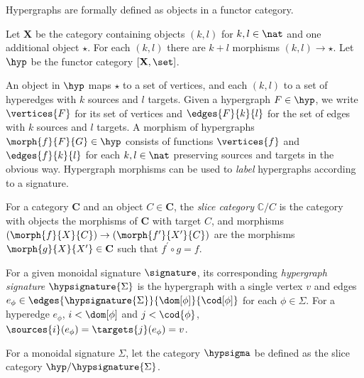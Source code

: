 Hypergraphs are formally defined as objects in a functor category.

\begin{definition}[Hypergraph]
    Let \(\mathbf{X}\) be the category containing objects \((k, l)\) for
    \(k, l \in \nat\) and one additional object \(\star\).
    For each \((k, l)\) there are \(k + l\) morphisms \((k, l) \to \star\).
    Let \(\hyp\) be the functor category \([\mathbf{X},\set]\).
\end{definition}

An object in \(\hyp\) maps \(\star\) to a set of vertices, and each \((k,l)\) to
a set of hyperedges with \(k\) sources and \(l\) targets.
Given a hypergraph \(F \in \hyp\), we write \(\vertices{F}\) for its set of
vertices and \(\edges{F}{k}{l}\) for the set of edges with \(k\) sources and
\(l\) targets.
A morphism of hypergraphs \(\morph{f}{F}{G} \in \hyp\) consists of functions
\(\vertices{f}\) and \(\edges{f}{k}{l}\) for each \(k,l \in \nat\) preserving
sources and targets in the obvious way.
Hypergraph morphisms can be used to \emph{label} hypergraphs according to a
signature.

\begin{definition}
    For a category \(\mathbf{C}\) and an object \(C \in \mathbf{C}\), the
    \emph{slice category} \(\mathbb{C} / C\) is the category with objects the
    morphisms of \(\mathbf{C}\) with target \(C\), and morphisms \(
        (\morph{f}{X}{C}) \to (\morph{f^\prime}{X^\prime}{C})
    \) are the morphisms \(\morph{g}{X}{X^\prime} \in \mathbf{C}\) such that
    \(f^\prime \circ g = f\).
\end{definition}

\begin{definition}
    For a given monoidal signature \(\signature\), its corresponding
    \emph{hypergraph signature} \(\hypsignature{\Sigma}\) is the hypergraph with
    a single vertex \(v\) and edges \(
        e_\phi \in \edges{\hypsignature{\Sigma}}{\dom[\phi]}{\cod[\phi]}
    \) for each \(\phi \in \Sigma\).
    For a hyperedge \(e_\phi\), \(i < \dom[\phi]\) and \(j < \cod{\phi}\), \(
        \sources{i}(e_\phi) = \targets{j}(e_\phi) = v
    \).
\end{definition}

\begin{definition}
    For a monoidal signature \(\Sigma\), let the category \(\hypsigma\) be
    defined as the slice category \(\hyp / \hypsignature{\Sigma}\).
\end{definition}

